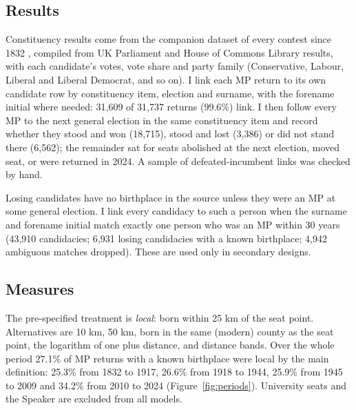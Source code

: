 \documentclass[11pt,a4paper]{article}
\begin{document}
\subsection{Results}
Constituency results come from the companion dataset of every contest since 1832 \citep{hotham2026ele}, compiled from UK Parliament and House of Commons Library results, with each candidate's votes, vote share and party family (Conservative, Labour, Liberal and Liberal Democrat, and so on). I link each MP return to its own candidate row by constituency item, election and surname, with the forename initial where needed: 31{,}609 of 31{,}737 returns (99.6\%) link. I then follow every MP to the next general election in the same constituency item and record whether they stood and won (18{,}715), stood and lost (3{,}386) or did not stand there (6{,}562); the remainder sat for seats abolished at the next election, moved seat, or were returned in 2024. A sample of defeated-incumbent links was checked by hand.

Losing candidates have no birthplace in the source unless they were an MP at some general election. I link every candidacy to such a person when the surname and forename initial match exactly one person who was an MP within 30 years (43{,}910 candidacies; 6{,}931 losing candidacies with a known birthplace; 4{,}942 ambiguous matches dropped). These are used only in secondary designs.

\subsection{Measures}
The pre-specified treatment is \emph{local}: born within 25 km of the seat point. Alternatives are 10 km, 50 km, born in the same (modern) county as the seat point, the logarithm of one plus distance, and distance bands. Over the whole period 27.1\% of MP returns with a known birthplace were local by the main definition: 25.3\% from 1832 to 1917, 26.6\% from 1918 to 1944, 25.9\% from 1945 to 2009 and 34.2\% from 2010 to 2024 (Figure~\ref{fig:periods}). University seats and the Speaker are excluded from all models.
\end{document}
